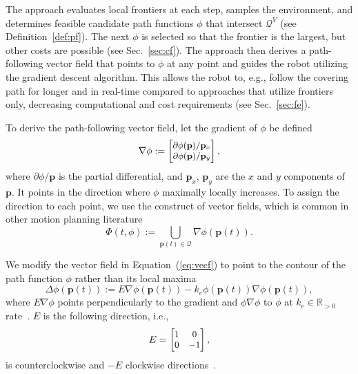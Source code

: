 \documentclass[lettersize,journal]{IEEEtran}
\theoremstyle{definition}
\begin{document}
The %
approach evaluates local frontiers at each step, samples the environment, and determines feasible candidate path functions $\phi$ that intersect $\mathcal{Q}^V$ (see Definition~\ref{def:pf}).
The next $\phi$ is selected so that the frontier is the largest, but other costs are possible (see Sec.~\ref{sec:cf}). 
The %
approach then derives a path-following vector field that points to $\phi$ at any point and guides the robot utilizing the gradient descent algorithm. This allows the robot to, e.g., follow the covering path for longer and in real-time compared to approaches that utilize frontiers only, decreasing computational and cost requirements (see Sec.~\ref{sec:fe}).

To derive the path-following vector field, let the gradient of $\phi$ be defined
\begin{equation}\small
  \nabla\phi:=\begin{bmatrix}
    \partial\phi(\mathbf{p})/\mathbf{p}_x\\
    \partial\phi(\mathbf{p})/\mathbf{p}_y
  \end{bmatrix},
\end{equation}
where $\partial\phi/\mathbf{p}$ is the partial differential, and $\mathbf{p}_x$, $\mathbf{p}_y$ are the $x$ and $y$ components of $\mathbf{p}$.
It points in the direction where $\phi$ maximally locally increases. To assign the direction to each point, we use the construct of vector fields, which is common in other motion planning literature~\cite{lavalle2006planning,garcia2017guidance,goncalves2010vector}
\begin{equation}\label{eq:vecf}
  \Phi(t,\phi):={\textstyle \bigcup\limits_{\mathbf{p}(t)\in\mathcal{Q}}}\nabla\phi(\mathbf{p}(t)).
\end{equation}

We modify the vector field in Equation~(\ref{eq:vecf}) to point to the contour of the path function $\phi$ rather than its local maxima
\begin{equation}\label{eq:pfvf}
  \Delta\phi(\mathbf{p}(t)):=E\nabla\phi(\mathbf{p}(t))-k_e\phi(\mathbf{p}(t))\nabla\phi(\mathbf{p}(t)),
\end{equation}
where $E\nabla\phi$ points perpendicularly to the gradient and $\phi\nabla\phi$ to $\phi$ at $k_e\in\mathbb{R}_{>0}$ rate~\cite{garcia2017guidance}. $E$ is the following direction, i.e.,
\begin{equation}\small
  E=\begin{bmatrix}
    1 & 0\\ 0 & -1
  \end{bmatrix},
\end{equation}
is counterclockwise and $-E$ clockwise directions~\cite{seewaldphdthesis}.
\end{document}
